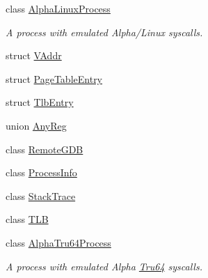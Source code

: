 \begin{DoxyCompactItemize}
class \hyperlink{classAlphaISA_1_1AlphaLinuxProcess}{AlphaLinuxProcess}
\begin{DoxyCompactList}\small\item\em A process with emulated Alpha/Linux syscalls. \item\end{DoxyCompactList}\item 
struct \hyperlink{structAlphaISA_1_1VAddr}{VAddr}
\item 
struct \hyperlink{structAlphaISA_1_1PageTableEntry}{PageTableEntry}
\item 
struct \hyperlink{structAlphaISA_1_1TlbEntry}{TlbEntry}
\item 
union \hyperlink{unionAlphaISA_1_1AnyReg}{AnyReg}
\item 
class \hyperlink{classAlphaISA_1_1RemoteGDB}{RemoteGDB}
\item 
class \hyperlink{classAlphaISA_1_1ProcessInfo}{ProcessInfo}
\item 
class \hyperlink{classAlphaISA_1_1StackTrace}{StackTrace}
\item 
class \hyperlink{classAlphaISA_1_1TLB}{TLB}
\item 
class \hyperlink{classAlphaISA_1_1AlphaTru64Process}{AlphaTru64Process}
\begin{DoxyCompactList}\small\item\em A process with emulated Alpha \hyperlink{classTru64}{Tru64} syscalls. \item\end{DoxyCompactList}\end{DoxyCompactItemize}

